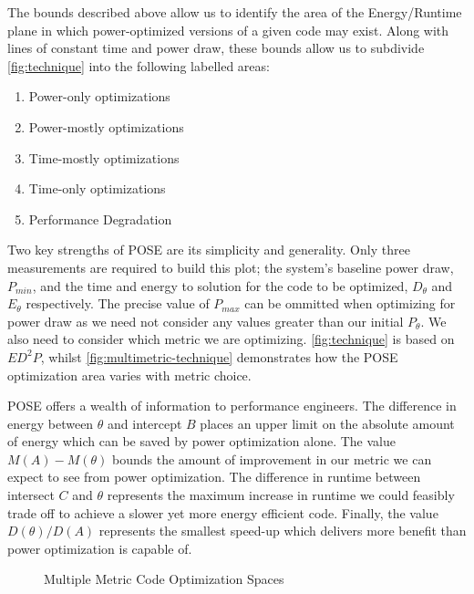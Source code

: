 The bounds described above allow us to identify the area of the Energy/Runtime plane in which power-optimized versions of a given code may exist. 
Along with lines of constant time and power draw, these bounds allow us to subdivide \autoref{fig:technique} into the following labelled areas:
\begin{enumerate}
\item Power-only optimizations
\item Power-mostly optimizations
\item Time-mostly optimizations
\item Time-only optimizations
\item Performance Degradation
\end{enumerate}

Two key strengths of POSE are its simplicity and generality.
Only three measurements are required to build this plot; the system's baseline power draw, $P_{min}$, and the time and energy to solution for the code to be optimized, $D_\theta$ and $E_\theta$ respectively.
The precise value of $P_{max}$ can be ommitted when optimizing for power draw as we need not consider any values greater than our initial $P_\theta$.
We also need to consider which metric we are optimizing. \autoref{fig:technique} is based on $ED^2P$, whilst \autoref{fig:multimetric-technique} demonstrates how the POSE optimization area varies with metric choice.

POSE offers a wealth of information to performance engineers.
The difference in energy between $\theta$ and intercept $B$ places an upper limit on the absolute amount of energy which can be saved by power optimization alone.
The value $M(A) - M(\theta)$ bounds the amount of improvement in our metric we can expect to see from power optimization.
The difference in runtime between intersect $C$ and $\theta$ represents the maximum increase in runtime we could feasibly trade off to achieve a slower yet more energy efficient code.
Finally, the value $D(\theta) / D(A)$ represents the smallest speed-up which delivers more benefit than power optimization is capable of.

\begin{figure}
\centering

\caption{Multiple Metric Code Optimization Spaces}
\label{fig:multimetric-technique}
\end{figure}
